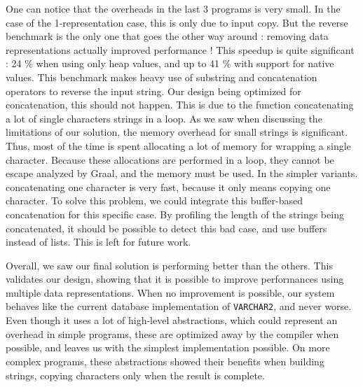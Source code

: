\documentclass[twoside,11pt,a4paper]{article}
\newcommand{\pls}[1]{\small\texttt{#1}\normalsize}
\newcommand{\plstype}[1]{\pls{#1}}
\newcommand{\varchar}{\plstype{VARCHAR2}}
\newcommand{\bench}[1]{\textsf{#1}}
\begin{document}
One can notice that the overheads in the last 3 programs is very small. In the case of the 1-representation case, this is only due to input copy. But the \bench{reverse} benchmark is the only one that goes the other way around : removing data representations actually improved performance ! This speedup is quite significant : 24 \% when using only heap values, and up to 41 \% with support for native values. This benchmark makes heavy use of substring and concatenation operators to reverse the input string. Our design being optimized for concatenation, this should not happen. This is due to the function concatenating a lot of single characters strings in a loop. As we saw when discussing the limitations of our solution, the memory overhead for small strings is significant. Thus, most of the time is spent allocating a lot of memory for wrapping a single character. Because these allocations are performed in a loop, they cannot be escape analyzed by Graal, and the memory must be used. In the simpler variants. concatenating one character is very fast, because it only means copying one character. To solve this problem, we could integrate this buffer-based concatenation for this specific case. By profiling the length of the strings being concatenated, it should be possible to detect this bad case, and use buffers instead of lists. This is left for future work.

Overall, we saw our final solution is performing better than the others. This validates our design, showing that it is possible to improve performances using multiple data representations. When no improvement is possible, our system behaves like the current database implementation of \varchar{}, and never worse. Even though it uses a lot of high-level abstractions, which could represent an overhead in simple programs, these are optimized away by the compiler when possible, and leaves us with the simplest implementation possible. On more complex programs, these abstractions showed their benefits when building strings, copying characters only when the result is complete.
\end{document}
